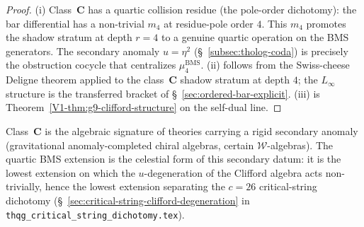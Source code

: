 \begin{proof}
(i) Class~$\mathbf C$ has a quartic collision residue
(the pole-order dichotomy): the bar differential has
a non-trivial $m_4$ at residue-pole order $4$. This $m_4$ promotes
the shadow stratum at depth $r=4$ to a genuine quartic operation on
the BMS generators. The secondary anomaly $u = \eta^2$
(\S~\ref{subsec:tholog-coda})
is precisely the obstruction cocycle that centralizes $\mu_4^{\mathrm{BMS}}$.
(ii) follows from the Swiss-cheese Deligne theorem applied to the
class~$\mathbf C$ shadow stratum at depth $4$; the $L_\infty$
structure is the transferred bracket of
\S~\ref{sec:ordered-bar-explicit}. (iii) is
Theorem~\ref{V1-thm:g9-clifford-structure} on the self-dual line.
\end{proof}

\begin{remark}
\label{rem:class-C-physics}
Class~$\mathbf C$ is the algebraic signature of theories carrying a
rigid secondary anomaly (gravitational anomaly-completed
chiral algebras, certain $\mathcal W$-algebras). The quartic BMS
extension is the celestial form of this secondary datum:
it is the lowest extension on which the $u$-degeneration of the Clifford algebra
acts non-trivially, hence the lowest extension separating
the $c=26$ critical-string dichotomy
(\S~\ref{sec:critical-string-clifford-degeneration} in
\texttt{thqg\_critical\_string\_dichotomy.tex}).
\end{remark}
